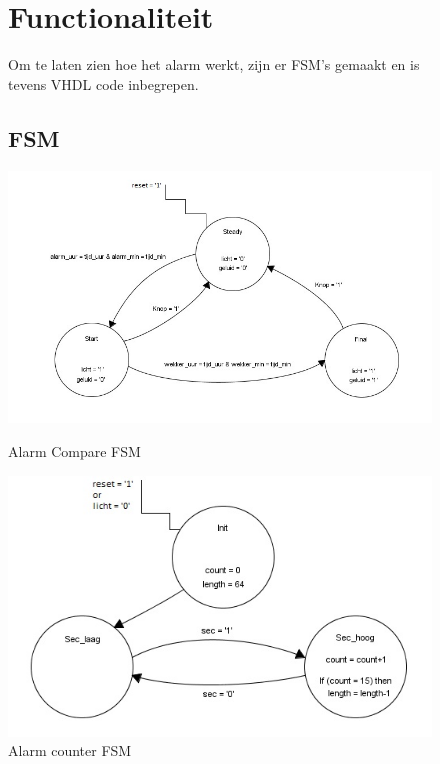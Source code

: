 \begin{figure}
\section{Functionaliteit}
Om te laten zien hoe het alarm werkt, zijn er FSM's gemaakt en is tevens VHDL code inbegrepen.
\subsection{FSM}
\includegraphics[width=\textwidth,height=\textheight,keepaspectratio]{Figuren/Alarm/FSM_compare.jpg}
\caption{Alarm Compare FSM}
\includegraphics[width=\textwidth,height=\textheight,keepaspectratio]{Figuren/Alarm/FSM_count.jpg}
\caption{Alarm counter FSM}
\end{figure}
